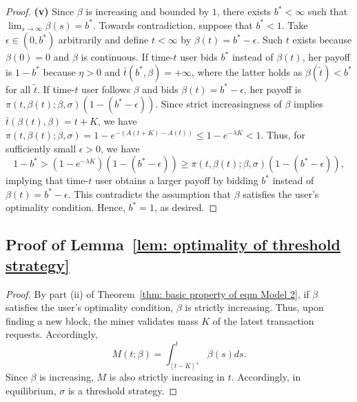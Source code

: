 \documentclass[12pt, letterpaper]{article}
\begin{document}
\begin{proof}
\textbf{(v)} Since $\beta$ is increasing and bounded by $1$, there exists $b^*<\infty$ such that $\lim_{s\to \infty}\beta (s) = b^*$. Towards contradiction, suppose that $b^* < 1$. Take $\epsilon \in (0, b^*)$ arbitrarily and define $t < \infty$ by $\beta(t) = b^* - \epsilon$. Such $t$ exists because $\beta(0)=0$ and $\beta$ is continuous. If time-$t$ user bids $b^*$ instead of $\beta(t)$, her payoff is $1 - b^*$ because $\eta>0$ and $\bar{t}(b^*, \beta) = + \infty$, where the latter holds as $\beta(\tilde{t})<b^*$ for all $\tilde{t}$. If time-$t$ user follows $\beta$ and bids $\beta(t) = b^* - \epsilon$, her payoff is $\pi(t, \beta(t); \beta, \sigma)(1 - (b^* - \epsilon))$.
Since strict increasingness of $\beta$ implies $\bar{t}(\beta(t), \beta) = t + K$, we have $\pi(t, \beta(t); \beta, \sigma) = 1 - e^{-(A(t + K) - A(t))} \le 1 - e^{-\lambda K} < 1$. Thus, for sufficiently small $\epsilon > 0$, we have
\begin{equation}
    1 - b^* > (1 - e^{-\lambda K})(1 - (b^* - \epsilon)) \ge \pi(t, \beta(t); \beta, \sigma)(1 - (b^* - \epsilon)),
\end{equation}
implying that time-$t$ user obtains a larger payoff by bidding $b^*$ instead of $\beta(t) = b^* - \epsilon$. This contradicts the assumption that $\beta$ satisfies the user's optimality condition. Hence, $b^* = 1$, as desired.
\end{proof}%



\subsection{Proof of Lemma~\ref{lem: optimality of threshold strategy}}

\begin{proof}%
By part (ii) of Theorem~\ref{thm: basic property of eqm Model 2}, if $\beta$ satisfies the user's optimality condition, $\beta$ is strictly increasing. Thus, upon finding a new block, the miner validates mass $K$ of the latest transaction requests. Accordingly,
\begin{equation}
    M(t; \beta) = \int_{[t-K]^+}^t \beta(s) ds.
\end{equation}
Since $\beta$ is increasing, $M$ is also strictly increasing in $t$. Accordingly, in equilibrium, $\sigma$ is a threshold strategy.
\end{proof}%
\end{document}
